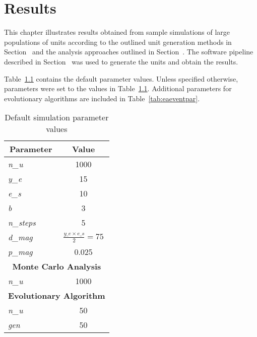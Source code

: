 \chapter{Results}
\label{chp:R}


This chapter illustrates results obtained from sample simulations of large populations of units according to the outlined unit generation methods in Section~ and the analysis approaches outlined in Section~. The software pipeline described in Section~ was used to generate the units and obtain the results.

Table~\ref{tab:defpar} contains the default parameter values. Unless specified otherwise, parameters were set to the values in Table~\ref{tab:defpar}. Additional parameters for evolutionary algorithms are included in Table~\ref{tab:eaeventpar}.

\begin{table}[H]
\centering
\caption{Default simulation parameter values}
\label{tab:defpar}
\begin{tabular}{@{}lc@{}}
\toprule
\multicolumn{1}{c}{\textbf{Parameter}} & \textbf{Value}                 \\ \midrule
\textit{n\_u}                          & 1000                           \\
\textit{y\_e}                          & 15                             \\
\textit{e\_s}                          & 10                             \\
\textit{b}                             & 3                              \\
\textit{n\_steps}                      & 5                              \\
\textit{d\_mag}                        & $\frac{y\_e\times e\_s}{2}=75$ \\
\textit{p\_mag}                        & 0.025                          \\ \midrule
\multicolumn{2}{c}{\textbf{Monte Carlo Analysis}}                       \\ \midrule
\textit{n\_u}                          & 1000                           \\ \midrule
\multicolumn{2}{c}{\textbf{Evolutionary Algorithm}}                     \\ \midrule
\textit{n\_u}                          & 50                             \\
\textit{gen}                           & 50                             \\ \bottomrule
\end{tabular}
\end{table}

